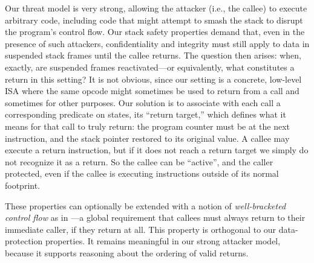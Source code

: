 \documentclass[acmtog,review,anonymous]{acmart}\settopmatter{printfolios=true,printccs=false,printacmref=false}
\begin{document}
Our threat model is very strong, allowing the attacker (i.e., the callee) to
execute arbitrary code, including code that might attempt to smash
the stack to disrupt the program's control flow.
Our stack safety properties demand that, even in the presence of such
attackers, confidentiality and integrity must
still apply to data in suspended stack frames until the callee returns.
The question then arises: when, exactly, are suspended frames
reactivated---or equivalently,
what constitutes a return in this setting? It is not obvious, since our
setting is a concrete, low-level ISA where the same opcode might sometimes
be used to return from a call and sometimes for other purposes.
Our solution is to associate with each call a corresponding predicate on states,
its ``return target,''
which defines what it means for that call to truly return: the program counter
must be at the next instruction, and the stack pointer restored to its original
value. A callee may execute a return instruction,
but if it does not reach a return target we simply do not recognize it as a
return.
So the callee can be ``active'', and the caller protected, even if the callee is
executing instructions outside of its normal footprint.  


These properties can optionally be extended with a notion of {\em well-bracketed control flow}
as in \citet{SkorstengaardSTK}---a global requirement that callees
must always return
to their immediate caller, if they return at all. This property is orthogonal to our
data-protection properties. It remains meaningful in our strong attacker model, because
it supports reasoning about the ordering of valid returns.
\end{document}
